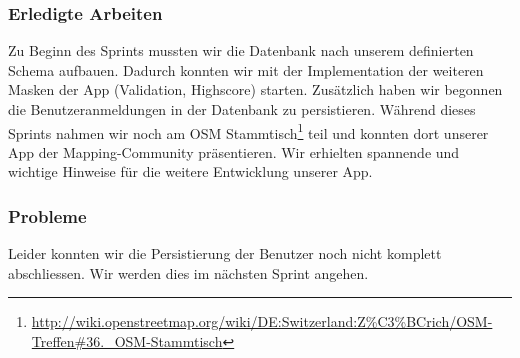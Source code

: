 \subsubsection{Erledigte Arbeiten}
Zu Beginn des Sprints mussten wir die Datenbank nach unserem definierten Schema aufbauen.
Dadurch konnten wir mit der Implementation der weiteren Masken der App (Validation, Highscore) starten.
Zusätzlich haben wir begonnen die Benutzeranmeldungen in der Datenbank zu persistieren.
Während dieses Sprints nahmen wir noch am OSM Stammtisch\footnote{\url{http://wiki.openstreetmap.org/wiki/DE:Switzerland:Z\%C3\%BCrich/OSM-Treffen\#36._OSM-Stammtisch}} teil und konnten dort unserer App der Mapping-Community präsentieren.
Wir erhielten spannende und wichtige Hinweise für die weitere Entwicklung unserer App.

\subsubsection{Probleme}
Leider konnten wir die Persistierung der Benutzer noch nicht komplett abschliessen.
Wir werden dies im nächsten Sprint angehen.